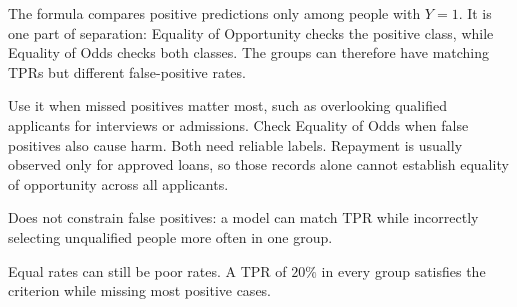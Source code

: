 \begin{metricformula}
\end{metricformula}

The formula compares positive predictions only among people with $Y=1$. It is one part of separation: Equality of Opportunity checks the positive class, while Equality of Odds checks both classes. The groups can therefore have matching TPRs but different false-positive rates.


Use it when missed positives matter most, such as overlooking qualified applicants for interviews or admissions. Check Equality of Odds when false positives also cause harm. Both need reliable labels. Repayment is usually observed only for approved loans, so those records alone cannot establish equality of opportunity across all applicants.


{
\item Does not constrain false positives: a model can match TPR while incorrectly selecting unqualified people more often in one group.
\item Equal rates can still be poor rates. A TPR of $20\%$ in every group satisfies the criterion while missing most positive cases.
}

\metricsecondpage

\thispagestyle{customstyle}

